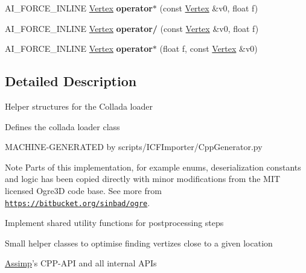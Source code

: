 \begin{DoxyCompactItemize}
\item 
\hypertarget{namespace_assimp_a1a60235e437afe22941928788d275dd7}{A\+I\+\_\+\+F\+O\+R\+C\+E\+\_\+\+I\+N\+L\+I\+N\+E \hyperlink{struct_assimp_1_1_m_d2_1_1_vertex}{Vertex} {\bfseries operator$\ast$} (const \hyperlink{struct_assimp_1_1_m_d2_1_1_vertex}{Vertex} \&v0, float f)}\label{namespace_assimp_a1a60235e437afe22941928788d275dd7}

\item 
\hypertarget{namespace_assimp_a7d888ec18cace2e5c7a510537dfd8c9d}{A\+I\+\_\+\+F\+O\+R\+C\+E\+\_\+\+I\+N\+L\+I\+N\+E \hyperlink{struct_assimp_1_1_m_d2_1_1_vertex}{Vertex} {\bfseries operator/} (const \hyperlink{struct_assimp_1_1_m_d2_1_1_vertex}{Vertex} \&v0, float f)}\label{namespace_assimp_a7d888ec18cace2e5c7a510537dfd8c9d}

\item 
\hypertarget{namespace_assimp_aa0a4362d7b408d7dc867a74af2ab2f00}{A\+I\+\_\+\+F\+O\+R\+C\+E\+\_\+\+I\+N\+L\+I\+N\+E \hyperlink{struct_assimp_1_1_m_d2_1_1_vertex}{Vertex} {\bfseries operator$\ast$} (float f, const \hyperlink{struct_assimp_1_1_m_d2_1_1_vertex}{Vertex} \&v0)}\label{namespace_assimp_aa0a4362d7b408d7dc867a74af2ab2f00}

\end{DoxyCompactItemize}


\subsection{Detailed Description}
Helper structures for the Collada loader

Defines the collada loader class

M\+A\+C\+H\+I\+N\+E-\/\+G\+E\+N\+E\+R\+A\+T\+E\+D by scripts/\+I\+C\+F\+Importer/\+Cpp\+Generator.\+py

\begin{DoxyNote}{Note}
Parts of this implementation, for example enums, deserialization constants and logic has been copied directly with minor modifications from the M\+I\+T licensed Ogre3\+D code base. See more from \href{https://bitbucket.org/sinbad/ogre}{\tt https\+://bitbucket.\+org/sinbad/ogre}.
\end{DoxyNote}
Implement shared utility functions for postprocessing steps

Small helper classes to optimise finding vertizes close to a given location

\hyperlink{class_assimp}{Assimp}'s C\+P\+P-\/\+A\+P\+I and all internal A\+P\+Is 

